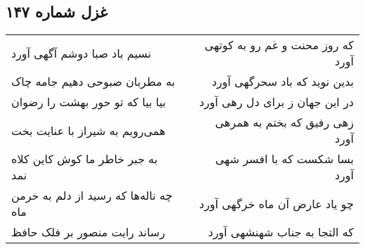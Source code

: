 \begin{center}
\section*{غزل شماره ۱۴۷}
\label{sec:sh147}
\begin{longtable}{l p{0.5cm} r}
نسیم باد صبا دوشم آگهی آورد
&&
که روز محنت و غم رو به کوتهی آورد
\\
به مطربان صبوحی دهیم جامه چاک
&&
بدین نوید که باد سحرگهی آورد
\\
بیا بیا که تو حور بهشت را رضوان
&&
در این جهان ز برای دل رهی آورد
\\
همی‌رویم به شیراز با عنایت بخت
&&
زهی رفیق که بختم به همرهی آورد
\\
به جبر خاطر ما کوش کاین کلاه نمد
&&
بسا شکست که با افسر شهی آورد
\\
چه ناله‌ها که رسید از دلم به خرمن ماه
&&
چو یاد عارض آن ماه خرگهی آورد
\\
رساند رایت منصور بر فلک حافظ
&&
که التجا به جناب شهنشهی آورد
\\
\end{longtable}
\end{center}
